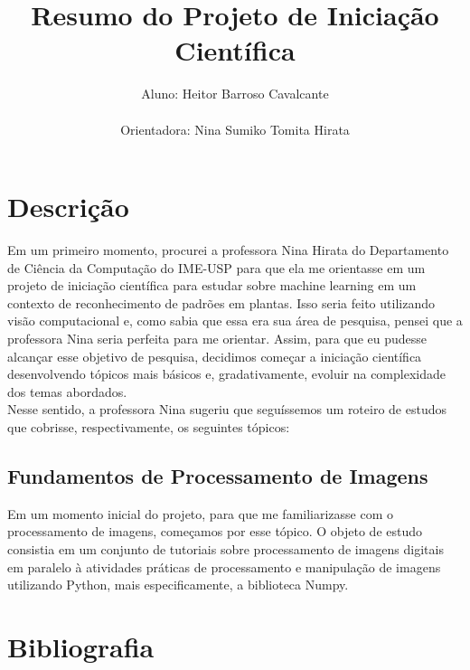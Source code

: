 \documentclass{article}
\title{Resumo do Projeto de Iniciação Científica}
\author{
  Aluno: Heitor Barroso Cavalcante\\
  \\
  Orientadora: Nina Sumiko Tomita Hirata\\
}
\begin{document}
\maketitle

\section{Descrição}
Em um primeiro momento, procurei a professora Nina Hirata do Departamento de Ciência da Computação do IME-USP
 para que ela me orientasse em um projeto de iniciação científica para estudar sobre machine learning em um
contexto de reconhecimento de padrões em plantas. Isso seria feito utilizando visão computacional e, como
sabia que essa era sua área de pesquisa, pensei que a professora Nina seria perfeita para me orientar. 
Assim, para que eu pudesse alcançar esse objetivo de pesquisa, decidimos começar a iniciação científica 
desenvolvendo tópicos mais básicos e, gradativamente, evoluir na complexidade dos temas abordados.
\\

Nesse sentido, a professora Nina sugeriu que seguíssemos um roteiro de estudos que cobrisse, respectivamente, 
os seguintes tópicos:

\subsection{Fundamentos de Processamento de Imagens}
Em um momento inicial do projeto, para que me familiarizasse com o processamento de imagens, começamos por esse
tópico. O objeto de estudo consistia em um conjunto de tutoriais sobre processamento de imagens digitais em 
paralelo à atividades práticas de processamento e manipulação de imagens utilizando Python, mais especificamente, 
a biblioteca Numpy.


\section{Bibliografia}




\end{document}
